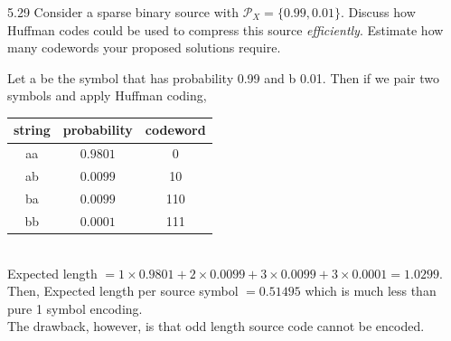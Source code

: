 \documentclass[12pt, a4paper]{article}
\begin{document}
\begin{prob}{5.29}
    Consider a sparse binary source with $\mathcal{P}_X = \{0.99, 0.01\}$. Discuss how Huffman codes could be used to compress this source \textit{efficiently}. Estimate how many codewords your proposed solutions require.
\end{prob}
\begin{sol}
Let a be the symbol that has probability 0.99 and b 0.01. Then if we pair two symbols and apply Huffman coding, \\

\begin{tabular}{c c c}
    string & probability & codeword \\
    \hline
    aa & $0.9801$ & 0 \\
    ab & $0.0099$ & 10 \\
    ba & $0.0099$ & 110 \\
    bb & $0.0001$ & 111 \\
\end{tabular}\\

Expected length $= 1 \times 0.9801 + 2 \times 0.0099 + 3 \times 0.0099 + 3 \times 0.0001 = 1.0299$. \\
Then, Expected length per source symbol $= 0.51495$ which is much less than pure 1 symbol encoding. \\
The drawback, however, is that odd length source code cannot be encoded.
\end{sol}
\bigskip
\end{document}
